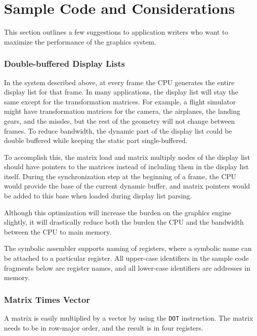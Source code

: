 \documentclass{book}
\begin{document}
\chapter{Sample Code and Considerations}


This section outlines a few suggestions to application writers who want
to maximize the performance of the graphics system.

\subsection{Double-buffered Display Lists}\label{sec:dblbuffer}

In the system described above, at every frame the CPU generates the
entire display list for that frame.  In many applications, the display
list will stay the same except for the transformation matrices.  For
example, a flight simulator might have transformation matrices for
the camera, the airplanes, the landing gears, and the missles, but
the rest of the geometry will not change between frames.  To reduce
bandwidth, the dynamic part of the display list could be double
buffered while keeping the static part single-buffered.

To accomplish this, the matrix load and matrix multiply nodes of the
display list should have pointers to the matrices instead of including
them in the display list itself.  During the synchronization step at
the beginning of a frame, the CPU would provide the base of the current
dynamic buffer, and matrix pointers would be added to this base when
loaded during display list parsing.

Although this optimization will increase the burden on the graphics
engine slightly, it will drastically reduce both the burden the CPU
and the bandwidth between the CPU to main memory.


The symbolic assembler supports naming of registers, where a symbolic
name can be attached to a particular register.  All upper-case identifiers
in the sample code fragments below are register names, and all lower-case
identifiers are addresses in memory.

\subsection{Matrix Times Vector}

A matrix is easily multiplied by a vector by using the {\tt DOT}
instruction.  The matrix needs to be in row-major order, and the
result is in four registers.
\end{document}
